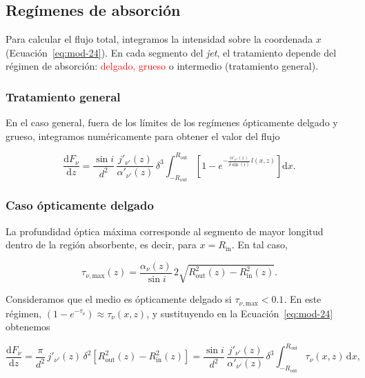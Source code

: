 \subsection{Regímenes de absorción}

	Para calcular el flujo total, integramos la intensidad sobre la coordenada $x$ (Ecuación~\ref{eq:mod-24}).
	En cada segmento del \textit{jet}, el tratamiento depende del régimen de absorción: \textcolor{red}{delgado, grueso} o intermedio (tratamiento general).

\subsubsection*{Tratamiento general}

	En el caso general, fuera de los límites de los regímenes ópticamente delgado y grueso, integramos numéricamente para obtener el valor del flujo

\begin{equation}\label{eq:mod-44}
    \frac{\mathrm{d}F_{\nu}}{\mathrm{d}z}
    = \frac{\sin i}{d^2}\,
      \frac{j'_{\nu'}(z)}{\alpha'_{\nu'}(z)}\, \delta^3
      \int_{-R_\mathrm{out}}^{R_\mathrm{out}} \left[ 1 - e^{-\frac{\alpha'_{\nu'}(z)}{\delta \sin(i)}\, l(x, z)} \right] \mathrm{d}x.
\end{equation}

\subsubsection*{Caso ópticamente delgado}

	La profundidad óptica máxima corresponde al segmento de mayor longitud dentro de la región absorbente, es decir, para $x = R_\mathrm{in}$.
	En tal caso,

\begin{equation}\label{eq:mod-41}
    \tau_{\nu,\mathrm{max}}(z)
    = \frac{\alpha_\nu(z)}{\sin i}
      \, 2\sqrt{R_{\mathrm{out}}^2(z) - R_{\mathrm{in}}^2(z)}.
\end{equation}

	Consideramos que el medio es ópticamente delgado si $\tau_{\nu,\mathrm{max}} < 0.1$.
	En este régimen, $(1 - e^{-\tau_{\nu}}) \approx \tau_{\nu}(x, z)$, y sustituyendo en la Ecuación~\eqref{eq:mod-24} obtenemos

\[\]
\begin{equation*}
    \frac{\mathrm{d}F_{\nu}}{\mathrm{d}z}= \frac{\pi}{d^2}\, j'_{\nu'}(z)\, \delta^2
      \left[R_\mathrm{out}^2(z) - R_\mathrm{in}^2(z)\right]
    = \frac{\sin i}{d^2}\,
      \frac{j'_{\nu'}(z)}{\alpha'_{\nu'}(z)}\, \delta^3
      \int_{-R_\mathrm{out}}^{R_\mathrm{out}} \tau_{\nu}(x, z)\, \mathrm{d}x,
\end{equation*}

